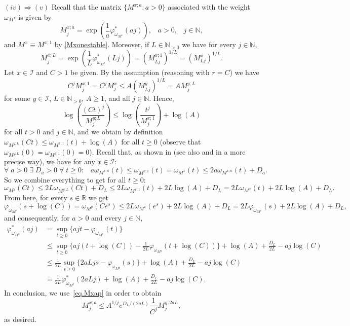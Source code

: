 \documentclass[10pt]{amsart}%
\numberwithin{equation}{section}
\theoremstyle{plain}
\newcommand{\RR}{\mathbb{R}}
\newcommand{\NN}{\mathbb{N}}
\begin{document}
$(iv)\Rightarrow(v)$ Recall that the matrix  $\{M^{x;a}: a>0\}$  associated with the weight $\omega_{M^x}$ is given by \begin{equation}\label{eq.Mxap}
M^{x;a}_j=\exp\left(\frac{1}{a}\varphi^{*}_{\omega_{M^x}}(a j)\right),\;\;\;a>0,\;\;\;j\in\NN,
\end{equation}
and $M^x\equiv M^{x;1}$ by \eqref{Mxonestable}.
Moreover, if $L\in\NN_{>0}$ we have for every $j\in\NN$,
\begin{equation*}%
M^{x;L}_j=\exp\left(\frac{1}{L}\varphi^{*}_{\omega_{M^x}}(L j)\right)=(M^{x;1}_{Lj})^{1/L}=(M^x_{Lj})^{1/L}.
\end{equation*}
Let $x\in\mathcal{I}$ and $C>1$ be given. By the assumption (reasoning with $r=C$) we have
$$C^jM^{x;1}_j=C^jM^x_j\le A(M^y_{Lj})^{1/L}=AM^{y;L}_j$$
for some $y\in\mathcal{I}$, $L\in\NN_{>0}$, $A\ge 1$, and all $j\in\NN$.
Hence,
$$\log\left(\frac{(Ct)^j}{M^{y;L}_j}\right)\le \log\left(\frac{t^j}{M^{x;1}_j}\right)+\log(A)$$
for all $t>0$ and $j\in\NN$, and we obtain by definition $\omega_{M^{y;L}}(Ct)\le\omega_{M^{x;1}}(t)+\log(A)$ for all $t\ge 0$ (observe that $\omega_{M^{y;L}}(0)=\omega_{M^{x;1}}(0)=0$).
Recall that, as shown in \cite[Lemma 5.7]{compositionpaper} (see also \cite[Theorem 4.0.3, Lemma 5.1.3]{dissertation} and \cite[Lemma 2.5]{sectorialextensions} in a more precise way), we have for any $x\in\mathcal{I}$:
\begin{equation}\label{goodequivalence}
\forall\;a>0\;\exists\;D_a>0\;\forall\;t\ge 0:\;\;\;a\omega_{M^{x;a}}(t)\le\omega_{M^{x;1}}(t)=\omega_{M^x}(t)\le 2a\omega_{M^{x;a}}(t)+D_a.
\end{equation}
So we combine everything to get for all $t\ge 0$:
$$\omega_{M^y}(Ct)\le 2L\omega_{M^{y;L}}(Ct)+D_L\le 2L\omega_{M^{x;1}}(t)+2L\log(A)+D_L=2L\omega_{M^x}(t)+2L\log(A)+D_L.$$
From here, for every $s\in\RR$ we get
$$
\varphi_{\omega_{M^y}}(s+\log(C))=\omega_{M^y}(Ce^s)\le
2L\omega_{M^x}(e^s)+2L\log(A)+D_L=2L\varphi_{\omega_{M^x}}(s)+2L\log(A)+D_L,
$$
and consequently, for $a>0$ and every $j\in\NN$,
\begin{align*}
\varphi^*_{\omega_{M^x}}(aj)&=\sup_{t\ge 0}\{ajt-\varphi_{\omega_{M^x}}(t)\}\\
&\le \sup_{t\ge 0}\{aj(t+\log(C))-\frac{1}{2L}\varphi_{\omega_{M^y}}(t+\log(C))\}+\log(A)+\frac{D_L}{2L}-aj\log(C)\\
&\le \frac{1}{2L}\sup_{s\ge 0}\{2aLjs-\varphi_{\omega_{M^y}}(s)\}+ \log(A)+\frac{D_L}{2L}-aj\log(C)\\
&=\frac{1}{2L}\varphi^*_{\omega_{M^y}}(2aLj)+\log(A)+\frac{D_L}{2L}-aj\log(C).
\end{align*}
In conclusion, we use~\eqref{eq.Mxap} in order to obtain
$$
M^{x;a}_j\le A^{1/j}e^{D_L/(2aL)}\frac{1}{C^j}M^{y;2aL}_j,
$$
as desired.\vspace{6pt}
\end{document}

